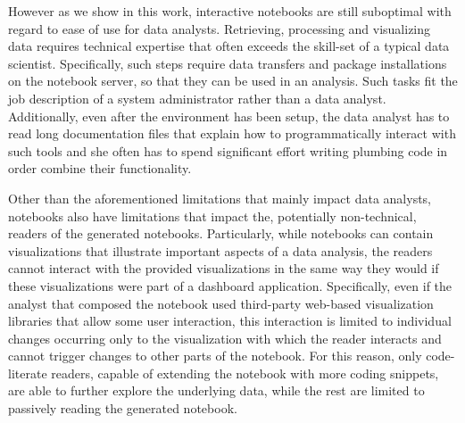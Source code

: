 However as we show in this work, interactive notebooks are still suboptimal with regard to ease of use for data analysts. Retrieving, processing and visualizing data requires technical expertise that often exceeds the skill-set of a typical data scientist. Specifically, such steps require data transfers and package installations on the notebook server, so that they can be used in an analysis. Such tasks fit the job description of a system administrator rather than a data analyst. Additionally, even after the environment has been setup, the data analyst has to read long documentation files that explain how to programmatically interact with such tools and she often has to spend significant effort writing plumbing code in order combine their functionality.

Other than the aforementioned limitations that mainly impact data analysts, notebooks also have limitations that impact the, potentially non-technical, readers of the generated notebooks. Particularly, while notebooks can contain visualizations that illustrate important aspects of a data analysis, the readers cannot interact with the provided visualizations in the same way they would if these visualizations were part of a dashboard application. Specifically, even if the analyst that composed the notebook used third-party web-based visualization libraries that allow some user interaction, this interaction is limited to individual changes occurring only to the visualization with which the reader  interacts and cannot trigger changes to other parts of the notebook. For this reason, only code-literate readers, capable of extending the notebook with more coding snippets, are able to further explore the underlying data, while the rest are limited to passively reading the generated notebook.\\




